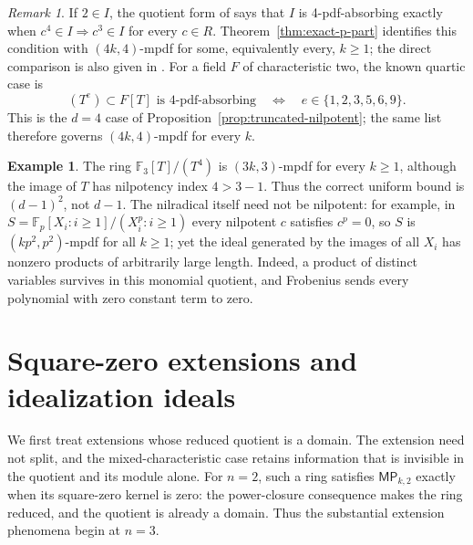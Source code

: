\documentclass[11pt,a4paper]{amsart}
\theoremstyle{definition}
\newtheorem{example}[theorem]{Example}
\theoremstyle{remark}
\newtheorem{remark}[theorem]{Remark}
\newcommand{\MP}[2]{\mathsf{MP}_{#1,#2}}
\numberwithin{equation}{section}
\begin{document}
\begin{remark}\label{quartic:characteristic-two}
If $2\in I$, the quotient form of \cite[Proposition~2.18]{TAHA}
says that $I$ is 4-pdf-absorbing exactly when
$c^4\in I\Rightarrow c^3\in I$ for every $c\in R$.
Theorem~\ref{thm:exact-p-part} identifies this condition with
$(4k,4)$-mpdf for some, equivalently every, $k\ge1$; the direct
comparison is also given in \cite[Corollary~3.21]{TS}.
For a field $F$ of characteristic two, the known quartic case
\cite[Corollary~2.19]{TAHA} is
\[
 (T^e)\subset F[T]\text{ is 4-pdf-absorbing}
 \quad\Longleftrightarrow\quad e\in\{1,2,3,5,6,9\}.
\]
This is the $d=4$ case of Proposition~\ref{prop:truncated-nilpotent};
the same list therefore governs $(4k,4)$-mpdf for every $k$.
\end{remark}

\begin{example}
The ring $\mathbb F_3[T]/(T^4)$ is $(3k,3)$-mpdf for every $k\geq1$,
although the image of $T$ has nilpotency index $4>3-1$.
Thus the correct uniform bound is $(d-1)^2$, not $d-1$.
The nilradical itself need not be nilpotent: for example, in
$S=\mathbb F_p[X_i:i\geq1]/(X_i^p:i\geq1)$ every nilpotent $c$ satisfies
$c^p=0$, so $S$ is $(kp^2,p^2)$-mpdf for all $k\geq1$; yet the ideal
generated by the images of all $X_i$ has nonzero products of arbitrarily
large length. Indeed, a product of distinct variables survives in this
monomial quotient, and Frobenius sends every polynomial with zero constant
term to zero.
\end{example}

\section{Square-zero extensions and idealization ideals}\label{sec:squarezero}

We first treat extensions whose reduced quotient is a domain.  The extension
need not split, and the mixed-characteristic case retains information that
is invisible in the quotient and its module alone.
For $n=2$, such a ring satisfies $\MP{k}{2}$ exactly when its
square-zero kernel is zero: the power-closure consequence makes the
ring reduced, and the quotient is already a domain. Thus the substantial
extension phenomena begin at $n=3$.
\end{document}
